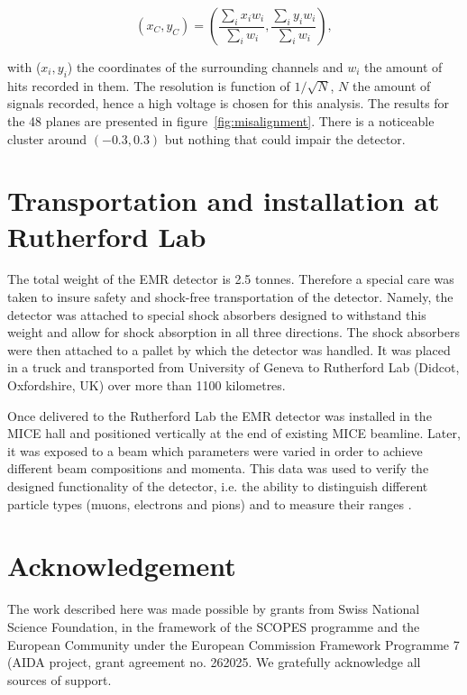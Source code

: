 \documentclass[a4paper,11pt]{article}
\begin{document}
\begin{equation}
(x_C,y_C)=\left(\frac{\sum_ix_iw_i}{\sum_iw_i},\frac{\sum_iy_iw_i}{\sum_iw_i}\right),
\end{equation}

with ($x_i,y_i$) the coordinates of the surrounding channels and $w_i$ the amount of hits recorded in them. The resolution is function of $1/\sqrt{N}$, $N$ the amount of signals recorded, hence a high voltage is chosen for this analysis. The results for the 48 planes are presented in figure~\ref{fig:misalignment}. There is a noticeable cluster around $(-0.3,0.3)$ but nothing that could impair the detector.



\section{Transportation and installation at Rutherford Lab}

The total weight of the EMR detector is 2.5 tonnes. Therefore a special care was taken to insure safety and shock-free transportation of the detector.
Namely, the detector was attached to special shock absorbers designed to withstand this weight and allow for shock absorption in all three directions. The
shock absorbers were then attached to a pallet by which the detector was handled. It was placed in a truck and transported from University of Geneva to
Rutherford Lab (Didcot, Oxfordshire, UK) over more than 1100 kilometres. 

Once delivered to the Rutherford Lab the EMR detector was installed in the MICE hall and positioned vertically at the end of existing MICE beamline. Later,
it was exposed to a beam which parameters were varied in order to achieve different beam compositions and momenta. This data was used to verify the designed
functionality of the detector, i.e. the ability to distinguish different particle types (muons, electrons and pions) and to measure their ranges
\cite{performance}. 

\section*{Acknowledgement}
The work described here was made possible by grants from Swiss National Science Foundation, in the framework of the SCOPES programme and the European Community
under the European Commission Framework Programme 7 (AIDA project, grant agreement no. 262025. We gratefully acknowledge all sources of support.




\end{document}
